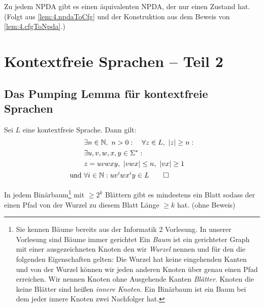 \begin{Bemerkung}
Zu jedem \ac{NPDA} gibt es einen äquivalenten \ac{NPDA}, der nur einen Zustand hat.
(Folgt aus \autoref{lem:4.npdaToCfg} und der Konstruktion aus dem Beweis von \autoref{lem:4.cfgToNpda}.)
\end{Bemerkung}



\section{Kontextfreie Sprachen -- Teil 2}

\subsection{Das Pumping Lemma für kontextfreie Sprachen}
\begin{Satz}
\label{satz:PL für CFL}
	Sei $L$ eine kontextfreie Sprache. Dann gilt:
	        \begin{alignat*}{2}
                &\exists n\in\N,\ n>0:\quad \forall z\in L,\ |z|\geq n:\\
                &\exists u,v,w,x,y\in\Sigma^* :\\
                &z = uvwxy,\ |vwx| \leq n,\ |vx| \geq 1\\
                \text{und }& \forall i\in\N: uv^iwx^iy\in L
        \qedhere
        \end{alignat*}
\end{Satz}
\begin{lemma}\label{lemma:Binärbaum}
	In jedem Binärbaum\footnote{
		Sie kennen Bäume bereits aus der Informatik 2 Vorlesung.
		In unserer Vorlesung sind Bäume immer gerichtet
		Ein \emph{Baum} ist ein gerichteter Graph mit einer ausgezeichneten Knoten den wir \emph{Wurzel} 
		nennen und für den die folgenden Eigenschaften gelten:
		Die Wurzel hat keine eingehenden Kanten und von der Wurzel können wir jeden anderen Knoten über genau einen Pfad erreichen.
		Wir nennen Knoten ohne Ausgehende Kanten \emph{Blätter}.
		Knoten die keine Blätter sind heißen \emph{innere Knoten}.
		Ein Binärbaum ist ein Baum bei dem jeder innere Knoten zwei Nachfolger hat.
	}
	mit $\geq 2^k$ Blättern gibt es mindestens ein Blatt sodass der einen Pfad von der Wurzel zu diesem Blatt Länge $\geq k$ hat.
	(ohne Beweis)
\end{lemma}

